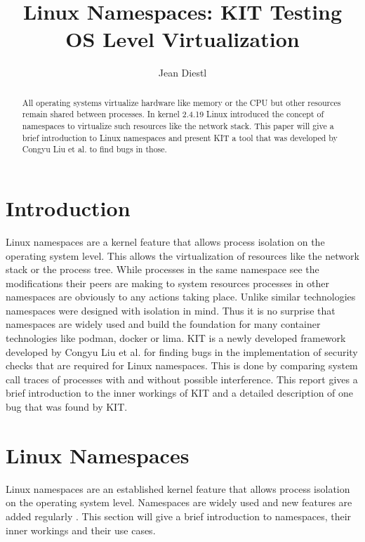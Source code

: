 \documentclass[10pt,twocolumn,a4paper]{article}
\author{Jean Diestl}
\begin{document}
\title{Linux Namespaces: KIT Testing OS Level Virtualization}

\newcommand{\todo}[1]{{\texttt{[#1]}}}
\newcommand{\code}[1]{{\tt \small{#1}}}

\maketitle

\lstset{language=C, basicstyle=\ttfamily,
        columns=fullflexible,
        string=[b]', showspaces=false, showtabs=false,
         captionpos=b,
        framerule=1pt,
        breaklines=true, breakatwhitespace=true,
        autogobble=true}

\begin{abstract}
All operating systems virtualize hardware like memory or the CPU but other resources remain shared between processes.
In kernel 2.4.19 Linux introduced the concept of namespaces to virtualize such resources like the network stack. This paper will give a brief 
introduction to Linux namespaces and present KIT a tool that was developed by Congyu Liu et al. to
find bugs in those.
\end{abstract}

\section{Introduction}\label{sec:introduction}
Linux namespaces are a kernel feature that allows process isolation on the operating system level.
This allows the virtualization of resources like the network stack or the process tree.
While processes in the same namespace see the modifications their peers are making to system resources
processes in other namespaces are obviously to any actions taking place. Unlike similar technologies namespaces were designed with
isolation in mind\cite{31}. Thus it is no surprise that namespaces are widely used and build the foundation
for many container technologies like podman, docker or lima\cite{33}.
KIT is a newly developed framework developed by Congyu Liu et al. for finding bugs in the implementation of
security checks that are required for Linux namespaces\cite{0}. 
This is done by comparing system call traces of processes with and without possible interference.
This report gives a brief introduction to the inner
workings of KIT and a detailed description of one bug
that was found by KIT. 

\section{Linux Namespaces}
Linux namespaces are an established kernel feature that allows process isolation on the operating system level.
Namespaces are widely used and new features are added regularly \cite{31}.
This section will give a brief introduction to namespaces, their inner workings and their use cases.
\end{document}
